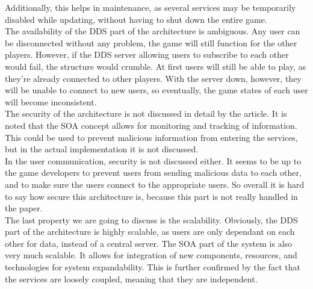 Additionally, this helps in maintenance, as several services may be temporarily disabled while updating, without having to shut down the entire game. \\
The availability of the DDS part of the architecture is ambiguous. 
Any user can be disconnected without any problem, the game will still function for the other players.
However, if the DDS server allowing users to subscribe to each other would fail, the structure would crumble.
At first users will still be able to play, as they're already connected to other players.
With the server down, however, they will be unable to connect to new users, so eventually, the game states of each user will become inconsistent. \\

The security of the architecture is not discussed in detail by the article.
It is noted that the SOA concept allows for monitoring and tracking of information.
This could be used to prevent malicious information from entering the services, but in the actual implementation it is not discussed. \\
In the user communication, security is not discussed either.
It seems to be up to the game developers to prevent users from sending malicious data to each other, and to make sure the users connect to the appropriate users.
So overall it is hard to say how secure this architecture is, because this part is not really handled in the paper.\\
The last property we are going to discuss is the scalability.
Obviously, the DDS part of the architecture is highly scalable, as users are only dependant on each other for data, instead of a central server.
The SOA part of the system is also very much scalable. 
It allows for integration of new components, resources, and technologies for system expandability.
This is further confirmed by the fact that the services are loosely coupled, meaning that they are independent.